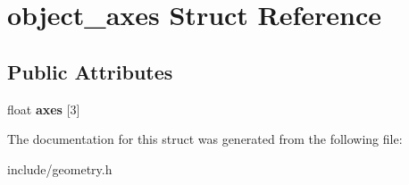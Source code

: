 \hypertarget{structobject__axes}{}\section{object\+\_\+axes Struct Reference}
\label{structobject__axes}
\subsection*{Public Attributes}
\begin{DoxyCompactItemize}
\item 
\mbox{\label{structobject__axes_a0d04d612437076c541cf3bc70434b2ce}} 
float {\bfseries axes} \mbox{[}3\mbox{]}
\end{DoxyCompactItemize}


The documentation for this struct was generated from the following file\+:\begin{DoxyCompactItemize}
\item 
include/geometry.\+h\end{DoxyCompactItemize}
